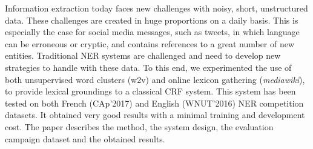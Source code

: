 Information extraction today faces new challenges with noisy, short, unstructured data. These challenges are created in huge proportions on a daily basis. This is especially the case for social media messages, such as tweets, in which language can be erroneous or cryptic, and contains references to a great number of new entities. Traditional NER systems are challenged and need to develop new strategies to handle with these data. To this end, we experimented the use of both unsupervised word clusters (w2v) and online lexicon gathering  (\textit{mediawiki}), to provide lexical groundings to a classical CRF system. This system has been tested on both French (CAp'2017) and English (WNUT'2016) NER competition datasets. It obtained very good results with a minimal training and development cost. The paper describes the method, the system design, the evaluation campaign dataset and the obtained results.
